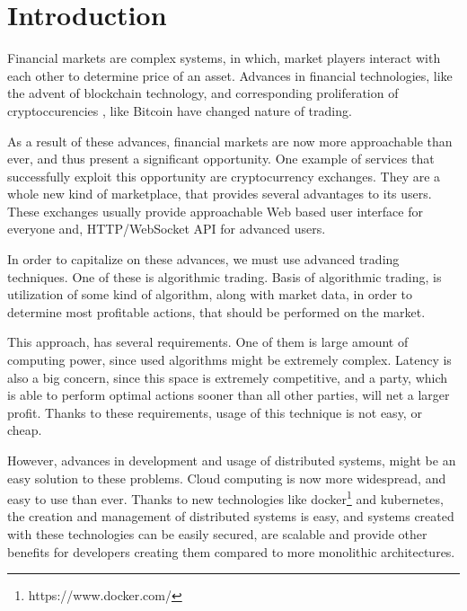 \providecommand*{\listingautorefname}{Code sample}

\newcommand{\trait}[1]{{#1}}

\newcommand{\type}[1]{{#1}}
\newcommand{\fun}[1]{{\texttt{#1}}}
\newcommand{\kubecomp}[1]{{#1}}
\newcommand{\actor}[1]{\textbf{#1}}
\newcommand{\msg}[1]{{#1}}



\chapter{Introduction}
\label{chapter:introduction}
Financial markets are complex systems, in which, market players interact with each other to determine
price of an asset. Advances in financial technologies, like the advent of blockchain technology,
and corresponding proliferation of cryptoccurencies , like Bitcoin\cite{bitcoin} have changed nature of trading.

As a result of these advances, financial markets are now more approachable than ever, and thus present a significant
opportunity. One example of services that successfully exploit this opportunity are cryptocurrency exchanges. They
are a whole new kind of marketplace, that provides several advantages to its users. These exchanges usually provide
approachable Web based user interface for everyone and, HTTP/WebSocket API for advanced users.

In order to capitalize on these advances, we must use advanced trading techniques. One of these is algorithmic
trading. Basis of algorithmic trading, is utilization of some kind of algorithm, along with market data, in
order to determine most profitable actions, that should be performed on the market.

This approach, has several requirements. One of them is large amount of computing power, since used algorithms
might be extremely complex. Latency is also a big concern, since this space is extremely competitive, and a party,
which is able to perform optimal actions sooner than all other parties, will net a larger profit.
Thanks to these requirements, usage of this technique is not easy, or cheap.

However, advances in development and usage of distributed systems, might be an easy solution to these problems.
Cloud computing\cite{wiki:cloud} is now more widespread, and easy to use than ever. Thanks to new technologies like
docker\footnote{https://www.docker.com/} and kubernetes\cite{web:k8s}, the creation and management of distributed systems is easy,
and systems created with these technologies can be easily secured, are scalable and provide other benefits
for developers creating them compared to more monolithic architectures.

